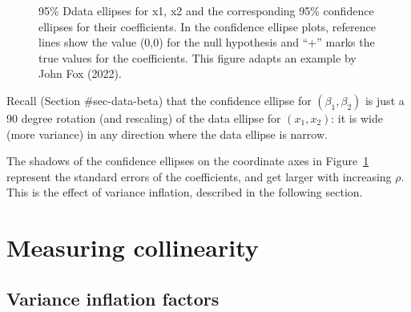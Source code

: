 \documentclass[
  letterpaper,
  10pt,
  krantz2]{krantz}
\begin{document}
\begin{figure}[H]


\caption{\label{fig-collin-data-beta}95\% Ddata ellipses for x1, x2 and
the corresponding 95\% confidence ellipses for their coefficients. In
the confidence ellipse plots, reference lines show the value (0,0) for
the null hypothesis and ``+'' marks the true values for the
coefficients. This figure adapts an example by John Fox (2022).}

\end{figure}%

Recall (Section \#sec-data-beta) that the confidence ellipse for
\((\beta_1, \beta_2)\) is just a 90 degree rotation (and rescaling) of
the data ellipse for \((x_1, x_2)\): it is wide (more variance) in any
direction where the data ellipse is narrow.

The shadows of the confidence ellipses on the coordinate axes in
Figure~\ref{fig-collin-data-beta} represent the standard errors of the
coefficients, and get larger with increasing \(\rho\). This is the
effect of variance inflation, described in the following section.

\section{Measuring collinearity}\label{sec-measure-collin}

\subsection{Variance inflation factors}\label{sec-vif}
\end{document}
